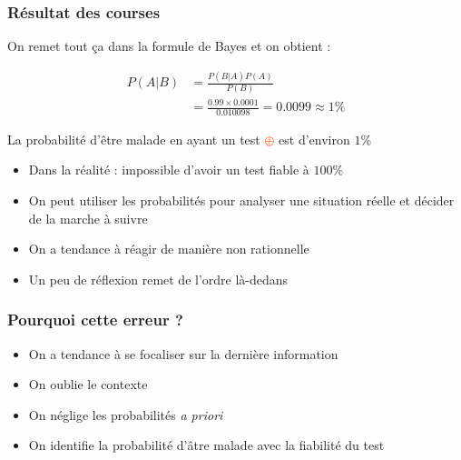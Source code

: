 \documentclass[usenames, dvipsnames, no-framenumber]{beamer}
\newcommand{\positif}{\textcolor{OrangeRed}{$\oplus$} }
\begin{document}
\begin{frame}%
\frametitle{Résultat des courses}

On remet tout ça dans la formule de Bayes et on obtient :

\begin{align*}
P(A|B) &= \frac{P(B|A)P(A)}{P(B)}\\
&= \frac{0.99 \times 0.0001}{0.010098} = 0.0099 \approx 1\%
\end{align*}


\pause
La probabilité d'être malade en ayant un test \positif est d'environ $1\%$

\pause

\begin{itemize}
\item Dans la réalité : impossible d'avoir un test fiable à $100\%$ \pause
\item On peut utiliser les probabilités pour analyser une situation réelle et décider de la marche à suivre \pause
\item On a tendance à réagir de manière non rationnelle\pause
\item Un peu de réflexion remet de l'ordre là-dedans%
\end{itemize}


\end{frame}


\begin{frame}%
\frametitle{Pourquoi cette erreur ?}






\vspace{2cm}

\begin{itemize}
\item<2-> On a tendance à se focaliser sur la dernière information
\item<3-> On oublie le contexte
\item<4-> On néglige les probabilités \textit{a priori}
\item<5-> On identifie la probabilité d'âtre malade avec la fiabilité du test
\end{itemize}


\end{frame}
\end{document}

